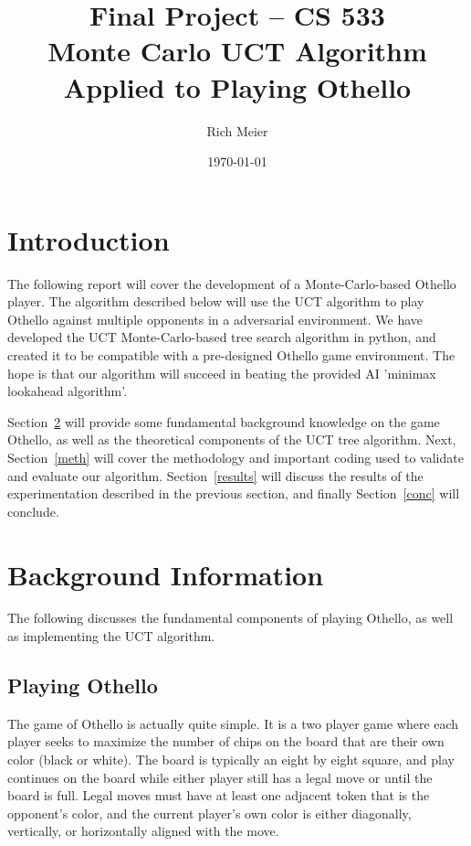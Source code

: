 \documentclass[12pt,letterpaper]{article}
\begin{document}
\title{\vspace{-1in}Final Project -- CS 533 \\ Monte Carlo UCT Algorithm Applied to Playing Othello}
\author{Rich Meier}
\date{\today}
\maketitle

\vspace{-.5in}
\section{Introduction}
The following report will cover the development of a Monte-Carlo-based Othello player. The algorithm described below will use the UCT algorithm to play Othello against multiple opponents in a adversarial environment. We have developed the UCT Monte-Carlo-based tree search algorithm in python, and created it to be compatible with a pre-designed Othello game environment. The hope is that our algorithm will succeed in beating the provided AI 'minimax lookahead algorithm'.

Section~\ref{back} will provide some fundamental background knowledge on the game Othello, as well as the theoretical components of the UCT tree algorithm.  Next, Section~\ref{meth} will cover the methodology and important coding used to validate and evaluate our algorithm. Section~\ref{results} will discuss the results of the experimentation described in the previous section, and finally Section~\ref{conc} will conclude.

\section{Background Information}
\label{back}

The following discusses the fundamental components of playing Othello, as well as implementing the UCT algorithm.

\subsection{Playing Othello}

The game of Othello is actually quite simple. It is a two player game where each player seeks to maximize the number of chips on the board that are their own color (black or white). The board is typically an eight by eight square, and play continues on the board while either player still has a legal move or until the board is full. Legal moves must have at least one adjacent token that is the opponent's color, and the current player's own color is either diagonally, vertically, or horizontally aligned with the move.  
\end{document}

